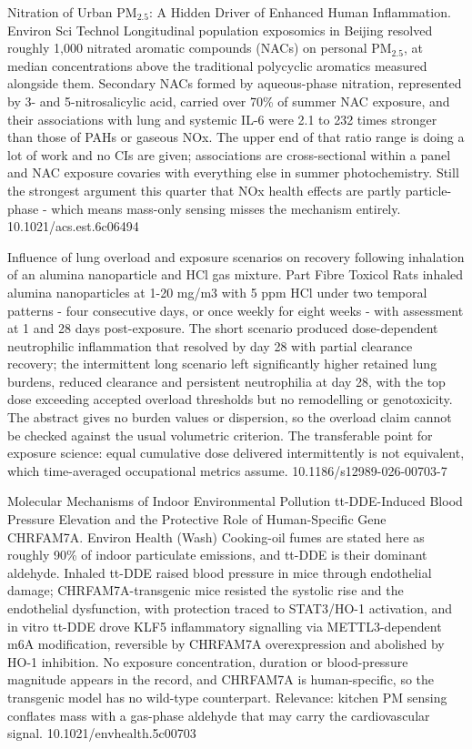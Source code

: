 \documentclass[10pt]{article}
\begin{document}

{Nitration of Urban PM$_{2.5}$: A Hidden Driver of Enhanced Human Inflammation.}
{Environ Sci Technol}
{Longitudinal population exposomics in Beijing resolved roughly 1,000 nitrated aromatic compounds (NACs) on personal PM$_{2.5}$, at median concentrations above the traditional polycyclic aromatics measured alongside them. Secondary NACs formed by aqueous-phase nitration, represented by 3- and 5-nitrosalicylic acid, carried over 70\% of summer NAC exposure, and their associations with lung and systemic IL-6 were 2.1 to 232 times stronger than those of PAHs or gaseous NOx. The upper end of that ratio range is doing a lot of work and no CIs are given; associations are cross-sectional within a panel and NAC exposure covaries with everything else in summer photochemistry. Still the strongest argument this quarter that NOx health effects are partly particle-phase - which means mass-only sensing misses the mechanism entirely.}
{10.1021/acs.est.6c06494}

{Influence of lung overload and exposure scenarios on recovery following inhalation of an alumina nanoparticle and HCl gas mixture.}
{Part Fibre Toxicol}
{Rats inhaled alumina nanoparticles at 1-20 mg/m3 with 5 ppm HCl under two temporal patterns - four consecutive days, or once weekly for eight weeks - with assessment at 1 and 28 days post-exposure. The short scenario produced dose-dependent neutrophilic inflammation that resolved by day 28 with partial clearance recovery; the intermittent long scenario left significantly higher retained lung burdens, reduced clearance and persistent neutrophilia at day 28, with the top dose exceeding accepted overload thresholds but no remodelling or genotoxicity. The abstract gives no burden values or dispersion, so the overload claim cannot be checked against the usual volumetric criterion. The transferable point for exposure science: equal cumulative dose delivered intermittently is not equivalent, which time-averaged occupational metrics assume.}
{10.1186/s12989-026-00703-7}

{Molecular Mechanisms of Indoor Environmental Pollution tt-DDE-Induced Blood Pressure Elevation and the Protective Role of Human-Specific Gene CHRFAM7A.}
{Environ Health (Wash)}
{Cooking-oil fumes are stated here as roughly 90\% of indoor particulate emissions, and tt-DDE is their dominant aldehyde. Inhaled tt-DDE raised blood pressure in mice through endothelial damage; CHRFAM7A-transgenic mice resisted the systolic rise and the endothelial dysfunction, with protection traced to STAT3/HO-1 activation, and in vitro tt-DDE drove KLF5 inflammatory signalling via METTL3-dependent m6A modification, reversible by CHRFAM7A overexpression and abolished by HO-1 inhibition. No exposure concentration, duration or blood-pressure magnitude appears in the record, and CHRFAM7A is human-specific, so the transgenic model has no wild-type counterpart. Relevance: kitchen PM sensing conflates mass with a gas-phase aldehyde that may carry the cardiovascular signal.}
{10.1021/envhealth.5c00703}
\end{document}
